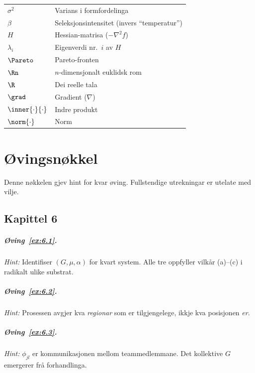 {\begin{longtable}{@{}p{28mm}p{62mm}@{}}
$\sigma^2$ & Varians i formfordelinga \\
$\beta$ & Seleksjonsintensitet (invers ``temperatur'') \\
$H$ & Hessian-matrisa ($-\nabla^2 f$) \\
$\lambda_i$ & Eigenverdi nr.~$i$ av $H$ \\
\addlinespace
$\Pareto$ & Pareto-fronten \\
$\Rn$ & $n$-dimensjonalt euklidsk rom \\
$\R$ & Dei reelle tala \\
$\grad$ & Gradient ($\nabla$) \\
$\inner{\cdot}{\cdot}$ & Indre produkt \\
$\norm{\cdot}$ & Norm \\
\end{longtable}
}


\chapter{Øvingsnøkkel}
\label{app:ovingsnokkel}

Denne nøkkelen gjev hint for kvar øving. Fullstendige
utrekningar er utelate med vilje.

\section*{Kapittel 6}

\paragraph{Øving~\ref{ex:6.1}.}
\emph{Hint:} Identifiser $(G, \mu, \alpha)$ for kvart system.
Alle tre oppfyller vilkår (a)--(c) i radikalt ulike substrat.

\paragraph{Øving~\ref{ex:6.2}.}
\emph{Hint:} Prosessen avgjer kva \emph{regionar} som er
tilgjengelege, ikkje kva posisjonen \emph{er}.

\paragraph{Øving~\ref{ex:6.3}.}
\emph{Hint:} $\phi_{jl}$ er kommunikasjonen mellom
teammedlemmane. Det kollektive $G$ emergerer frå forhandlinga.

